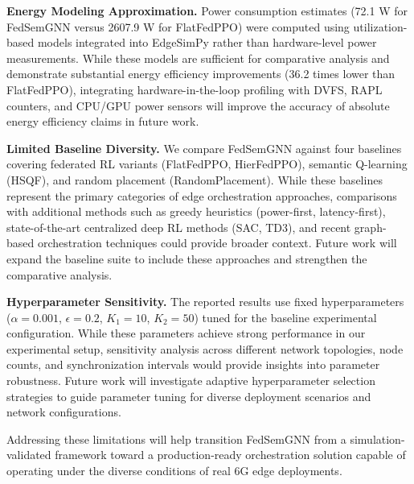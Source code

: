 \textbf{Energy Modeling Approximation.}
Power consumption estimates (72.1 W for FedSemGNN versus 2607.9 W for FlatFedPPO) were computed using utilization-based models integrated into EdgeSimPy rather than hardware-level power measurements. While these models are sufficient for comparative analysis and demonstrate substantial energy efficiency improvements (36.2 times lower than FlatFedPPO), integrating hardware-in-the-loop profiling with DVFS, RAPL counters, and CPU/GPU power sensors will improve the accuracy of absolute energy efficiency claims in future work.

\textbf{Limited Baseline Diversity.}
We compare FedSemGNN against four baselines covering federated RL variants (FlatFedPPO, HierFedPPO), semantic Q-learning (HSQF), and random placement (RandomPlacement). While these baselines represent the primary categories of edge orchestration approaches, comparisons with additional methods such as greedy heuristics (power-first, latency-first), state-of-the-art centralized deep RL methods (SAC, TD3), and recent graph-based orchestration techniques could provide broader context. Future work will expand the baseline suite to include these approaches and strengthen the comparative analysis.

\textbf{Hyperparameter Sensitivity.}
The reported results use fixed hyperparameters ($\alpha = 0.001$, $\epsilon = 0.2$, $K_1 = 10$, $K_2 = 50$) tuned for the baseline experimental configuration. While these parameters achieve strong performance in our experimental setup, sensitivity analysis across different network topologies, node counts, and synchronization intervals would provide insights into parameter robustness. Future work will investigate adaptive hyperparameter selection strategies to guide parameter tuning for diverse deployment scenarios and network configurations.

Addressing these limitations will help transition FedSemGNN from a simulation-validated framework toward a production-ready orchestration solution capable of operating under the diverse conditions of real 6G edge deployments.
